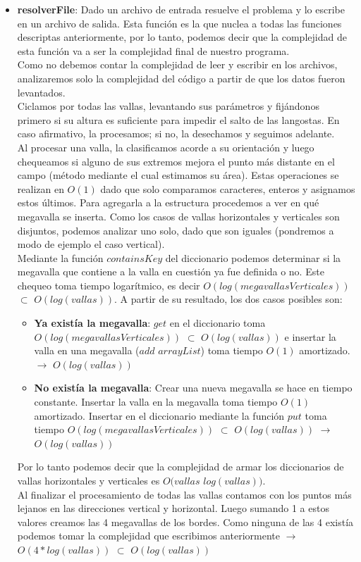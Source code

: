 \begin{itemize}
\begin{itemize}
\item \textbf{resolverFile}: Dado un archivo de entrada resuelve el problema y
lo escribe en un archivo de salida. Esta función es la que nuclea a todas las
funciones descriptas anteriormente, por lo tanto, podemos decir que la
complejidad de esta función va a ser la complejidad final de nuestro programa.\\
\indent Como no debemos contar la complejidad de leer y escribir en los
archivos, analizaremos solo la complejidad del código a partir de que los datos
fueron levantados.\\
\indent Ciclamos por todas las vallas, levantando sus parámetros y fijándonos primero si su altura es suficiente para impedir el salto de las langostas. En caso afirmativo, la procesamos; si no, la desechamos y seguimos adelante.\\
Al procesar una valla, la clasificamos acorde a su orientación y luego chequeamos si alguno de sus extremos mejora el punto más distante en el campo (método mediante el cual estimamos su área). Estas operaciones se realizan en $O(1)$ dado que solo comparamos caracteres, enteros y asignamos estos últimos. Para agregarla a la estructura procedemos a ver en qué megavalla se inserta. Como los casos de vallas
horizontales y verticales son disjuntos, podemos analizar uno solo, dado que son iguales (pondremos a modo de ejemplo el caso vertical).\\
\indent Mediante la función $containsKey$ del diccionario podemos determinar si la megavalla que contiene a la valla en cuestión ya fue definida o no. Este chequeo toma tiempo logarítmico, es decir $O(log(megavallasVerticales))$ $\subset$ $O(log(vallas))$. A partir de su resultado, los dos casos posibles son:
\begin{itemize}
 \item \textbf{Ya existía la megavalla}: $get$ en el diccionario toma
$O(log(megavallasVerticales))$ $\subset$ $O(log(vallas))$ e insertar la valla en una
megavalla ($add$ $arrayList$) toma tiempo $O(1)$ amortizado. $\rightarrow$
$O(log(vallas))$
 \item \textbf{No existía la megavalla}: Crear una nueva megavalla se hace en
tiempo constante. Insertar la valla en la megavalla toma tiempo $O(1)$ amortizado. Insertar en el diccionario mediante la función $put$ toma tiempo $O(log(megavallasVerticales))$ $\subset$ $O(log(vallas))$  $\rightarrow$ $O(log(vallas))$
\end{itemize}

Por lo tanto podemos decir que la complejidad de armar los diccionarios de vallas horizontales y verticales es $O(vallas$ $log(vallas))$.\\
\indent Al finalizar el procesamiento de todas las vallas contamos con los puntos más lejanos en las direcciones vertical y horizontal. Luego sumando 1 a estos valores creamos las 4 megavallas de los bordes. Como ninguna de las 4 existía podemos tomar la complejidad que escribimos anteriormente $\rightarrow$ $O(4*log(vallas))$ $\subset$ $O(log(vallas))$\\


\end{itemize}
\end{itemize}
